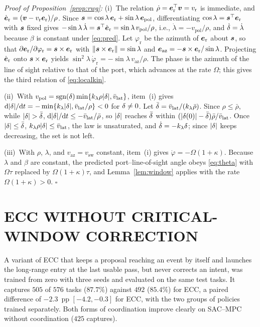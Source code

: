 \textit{Proof of Proposition~\ref{prop:rwg}:} (i)~The relation $\dot\rho=\boldsymbol{e}_{\mathrm{r}}^{\top}\boldsymbol{v}=v_{\mathrm{r}}$ is immediate, and $\dot{\boldsymbol{e}}_{\mathrm{r}}=(\boldsymbol{v}-v_{\mathrm{r}}\boldsymbol{e}_{\mathrm{r}})/\rho$. Since $\boldsymbol{s}=\cos\lambda\,\boldsymbol{e}_{\mathrm{r}}+\sin\lambda\,\boldsymbol{e}_{\mathrm{pol}}$, differentiating $\cos\lambda=\boldsymbol{s}^{\top}\boldsymbol{e}_{\mathrm{r}}$ with $\boldsymbol{s}$ fixed gives $-\sin\lambda\,\dot\lambda=\boldsymbol{s}^{\top}\dot{\boldsymbol{e}}_{\mathrm{r}}=\sin\lambda\,v_{\mathrm{pol}}/\rho$, i.e., $\dot\lambda=-v_{\mathrm{pol}}/\rho$, and $\dot{\delta}=\dot\lambda$ because $\beta$ is constant under \eqref{eq:pred}. Let $\varphi_{\mathrm{r}}$ be the azimuth of $\boldsymbol{e}_{\mathrm{r}}$ about $\boldsymbol{s}$, so that $\partial\boldsymbol{e}_{\mathrm{r}}/\partial\varphi_{\mathrm{r}}=\boldsymbol{s}\times\boldsymbol{e}_{\mathrm{r}}$ with $\left\lVert \boldsymbol{s}\times\boldsymbol{e}_{\mathrm{r}} \right\rVert=\sin\lambda$ and $\boldsymbol{e}_{\mathrm{az}}=-\boldsymbol{s}\times\boldsymbol{e}_{\mathrm{r}}/\sin\lambda$. Projecting $\dot{\boldsymbol{e}}_{\mathrm{r}}$ onto $\boldsymbol{s}\times\boldsymbol{e}_{\mathrm{r}}$ yields $\sin^{2}\lambda\,\dot\varphi_{\mathrm{r}}=-\sin\lambda\,v_{\mathrm{az}}/\rho$. The phase is the azimuth of the line of sight relative to that of the port, which advances at the rate $\Omega$; this gives the third relation of \eqref{eq:localkin}.

(ii)~With $v_{\mathrm{pol}}=\mathrm{sgn}(\delta)\min\{k_{\lambda}\rho|\delta|,\bar v_{\mathrm{lat}}\}$, item~(i) gives $\mathrm{d}|\delta|/\mathrm{d} t=-\min\{k_{\lambda}|\delta|,\bar v_{\mathrm{lat}}/\rho\}<0$ for $\delta\neq0$. Let $\bar{\delta}=\bar v_{\mathrm{lat}}/(k_{\lambda}\bar\rho)$. Since $\rho\le\bar\rho$, while $|\dlat|>\bar\dlat$, $\mathrm{d}|\delta|/\mathrm{d} t\le-\bar v_{\mathrm{lat}}/\bar\rho$, so $|\delta|$ reaches $\bar{\delta}$ within $(|\delta(0)|-\bar{\delta})\bar\rho/\bar v_{\mathrm{lat}}$. Once $|\delta|\le\bar{\delta}$, $k_{\lambda}\rho|\delta|\le\bar v_{\mathrm{lat}}$, the law is unsaturated, and $\dot{\delta}=-k_{\lambda}\delta$; since $|\delta|$ keeps decreasing, the set is not left.

(iii)~With $\rho$, $\lambda$, and $v_{\mathrm{az}}=v_{\mathrm{sw}}$ constant, item~(i) gives $\dot\varphi=-\Omega(1+\kappa)$. Because $\lambda$ and $\beta$ are constant, the predicted port--line-of-sight angle obeys \eqref{eq:theta} with $\Omega\tau$ replaced by $\Omega(1+\kappa)\tau$, and Lemma~\ref{lem:window} applies with the rate $\Omega(1+\kappa)>0$. \hfill$\square$

\section{ECC WITHOUT CRITICAL-WINDOW CORRECTION}\label{app:nocorr}

A variant of ECC that keeps a proposal reaching an event by itself and launches the long-range entry at the last usable pass, but never corrects an intent, was trained from zero with three seeds and evaluated on the same test tasks. It captures $505$ of $576$ tasks ($87.7\%$) against $492$ ($85.4\%$) for ECC, a paired difference of $-2.3$~pp $[-4.2,-0.3]$ for ECC, with the two groups of policies trained separately. Both forms of coordination improve clearly on SAC--MPC without coordination ($425$ captures).

